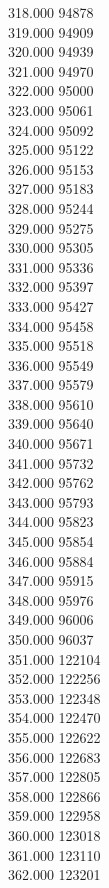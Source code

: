 { 318.000	94878 \\
 319.000	94909 \\
 320.000	94939 \\
 321.000	94970 \\
 322.000	95000 \\
 323.000	95061 \\
 324.000	95092 \\
 325.000	95122 \\
 326.000	95153 \\
 327.000	95183 \\
 328.000	95244 \\
 329.000	95275 \\
 330.000	95305 \\
 331.000	95336 \\
 332.000	95397 \\
 333.000	95427 \\
 334.000	95458 \\
 335.000	95518 \\
 336.000	95549 \\
 337.000	95579 \\
 338.000	95610 \\
 339.000	95640 \\
 340.000	95671 \\
 341.000	95732 \\
 342.000	95762 \\
 343.000	95793 \\
 344.000	95823 \\
 345.000	95854 \\
 346.000	95884 \\
 347.000	95915 \\
 348.000	95976 \\
 349.000	96006 \\
 350.000	96037 \\
 351.000	122104 \\
 352.000	122256 \\
 353.000	122348 \\
 354.000	122470 \\
 355.000	122622 \\
 356.000	122683 \\
 357.000	122805 \\
 358.000	122866 \\
 359.000	122958 \\
 360.000	123018 \\
 361.000	123110 \\
 362.000	123201 \\
}
